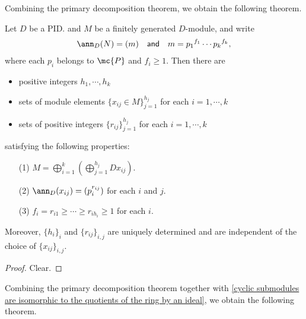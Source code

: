 Combining the primary decomposition theorem, we obtain the following theorem.
\begin{thm}\label{CDT 1 with the PDT}
    Let $D$ be a PID. and $M$ be a finitely generated $D$-module, and write
    \begin{align*}
        \ann_D(N)=(m)\quad\textsf{and}\quad m={p_1}^{f_1}\cdots{p_k}^{f_k},
    \end{align*}
    where each $p_i$ belongs to $\mc{P}$ and $f_i\geq 1$.
    Then there are
    \begin{itemize}
        \item
        {
            positive integers $h_1, \cdots, h_k$
        }
        \item
        {
            sets of module elements $\{x_{ij}\in M\}_{j=1}^{h_j}$ for each $i=1, \cdots, k$
        }
        \item
        {
            sets of positive integers $\{r_{ij}\}_{j=1}^{h_j}$ for each $i=1, \cdots, k$
        }
    \end{itemize}
    satisfying the following properties:
    \begin{enumerate}
        \item[(1)]
        {
            $M=\bigoplus_{i=1}^k\left(\bigoplus_{j=1}^{h_j} Dx_{ij}\right)$.
        }
        \item[(2)]
        {
            $\ann_D(x_{ij})=(p_i^{r_{ij}})$ for each $i$ and $j$.
        }
        \item[(3)]
        {
            $f_i = r_{i1} \geq\cdots\geq r_{ih_i}\geq 1$ for each $i$.
        }
    \end{enumerate}
    Moreover, $\{h_i\}_i$ and $\{r_{ij}\}_{i, j}$ are uniquely determined and are independent of the choice of $\{x_{ij}\}_{i, j}$.
\end{thm}
\begin{proof}
    Clear.
\end{proof}

Combining the primary decomposition theorem together with \cref{cyclic submodules are isomorphic to the quotients of the ring by an ideal}, we obtain the following theorem.

